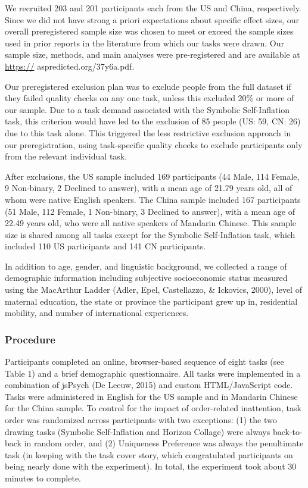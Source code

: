 \documentclass[
  man,floatsintext]{apa6}
\begin{document}
We recruited 203 and 201 participants each from the US and China, respectively. Since we did not have strong a priori expectations about specific effect sizes, our overall preregistered sample size was chosen to meet or exceed the sample sizes used in prior reports in the literature from which our tasks were drawn. Our sample size, methods, and main analyses were pre-registered and are available at \url{https://} aspredicted.org/37y6a.pdf.

Our preregistered exclusion plan was to exclude people from the full dataset if they failed quality checks on any one task, unless this excluded 20\% or more of our sample. Due to a task demand associated with the Symbolic Self-Inflation task, this criterion would have led to the exclusion of 85 people (US: 59, CN: 26) due to this task alone. This triggered the less restrictive exclusion approach in our preregistration, using task-specific quality checks to exclude participants only from the relevant individual task.

After exclusions, the US sample included 169 participants (44 Male, 114 Female, 9 Non-binary, 2 Declined to answer), with a mean age of 21.79 years old, all of whom were native English speakers. The China sample included 167 participants (51 Male, 112 Female, 1 Non-binary, 3 Declined to answer), with a mean age of 22.49 years old, who were all native speakers of Mandarin Chinese. This sample size is shared among all tasks except for the Symbolic Self-Inflation task, which included 110 US participants and 141 CN participants.

In addition to age, gender, and linguistic background, we collected a range of demographic information including subjective socioeconomic status measured using the MacArthur Ladder (Adler, Epel, Castellazzo, \& Ickovics, 2000), level of maternal education, the state or province the participant grew up in, residential mobility, and number of international experiences.

\hypertarget{procedure}{%
\subsubsection{Procedure}\label{procedure}}

Participants completed an online, browser-based sequence of eight tasks (see Table 1) and a brief demographic questionnaire. All tasks were implemented in a combination of jsPsych (De Leeuw, 2015) and custom HTML/JavaScript code. Tasks were administered in English for the US sample and in Mandarin Chinese for the China sample. To control for the impact of order-related inattention, task order was randomized across participants with two exceptions: (1) the two drawing tasks (Symbolic Self-Inflation and Horizon Collage) were always back-to-back in random order, and (2) Uniqueness Preference was always the penultimate task (in keeping with the task cover story, which congratulated participants on being nearly done with the experiment). In total, the experiment took about 30 minutes to complete.
\end{document}
